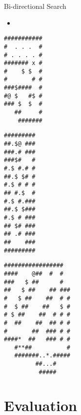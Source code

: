 \documentclass{beamer}
\begin{document}
\begin{frame}{Bi-directional Search}
  \begin{itemize}
  \item
  \end{itemize}
\end{frame}

\begin{lrbox}{\mapff}
  \begin{minipage}{.25\textwidth}
\centering
\begin{BVerbatim}
###########
#  . . .  #
# . . . . #
####### x #
#    $ $  #
#       # #
###$####  #
#@ $   #$ #
### $  $  #
   ##     #
    #######  
\end{BVerbatim}
  \end{minipage}
\end{lrbox}%

\begin{lrbox}{\mapss}
  \begin{minipage}{.25\textwidth}
\centering
\small{
\begin{BVerbatim}
#########
##.$@ ###
###.# ###
###$#   #
#.$ #.# #
##.$ $# #
#.$ # # #
## #.$  #
#.$ #.###
##.$ $###
#.$ # ###
## $# ###
## .# ###
##    ###
#########
\end{BVerbatim}
}
  \end{minipage}
\end{lrbox}%

\begin{lrbox}{\mapnt}
  \begin{minipage}{.25\textwidth}
\centering
\small{
\begin{BVerbatim}
#################  
####    @##  #  #  
###   $ ##      #  
##   $ ##    ## ###
#   $ ##    ##  # #
#  $ ##    ##   $ #
# $ ##    ##  # # #
#  ##    ##  ## # #
#       ##  ### # #
####*  ##   ### # #
   #**##          #
   #######..*.#####
         ##...#    
          #####
\end{BVerbatim}
}
  \end{minipage}
\end{lrbox}%




\section{Evaluation}
\end{document}
